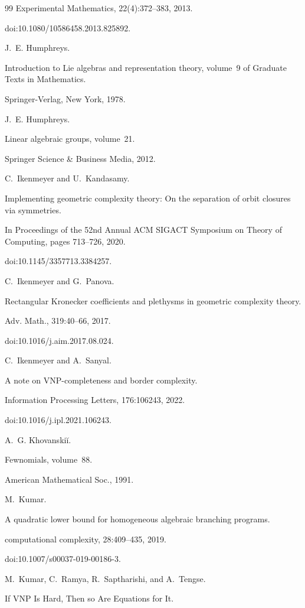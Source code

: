 \documentclass[10pt,a4paper]{article}
\begin{document}
\begin{thebibliography}{99}
Experimental Mathematics, 22(4):372–383, 2013.


doi:10.1080/10586458.2013.825892.

J. E. Humphreys.


Introduction to Lie algebras and representation theory,
volume 9 of Graduate Texts in Mathematics.


Springer-Verlag, New York, 1978.

J. E. Humphreys.


Linear algebraic groups, volume 21.


Springer Science \& Business Media, 2012.

C. Ikenmeyer and U. Kandasamy.


Implementing geometric complexity theory: On the separation of orbit
closures via symmetries.


In Proceedings of the 52nd Annual ACM SIGACT Symposium on
Theory of Computing, pages 713–726, 2020.


doi:10.1145/3357713.3384257.

C. Ikenmeyer and G. Panova.


Rectangular Kronecker coefficients and plethysms in geometric
complexity theory.


Adv. Math., 319:40–66, 2017.


doi:10.1016/j.aim.2017.08.024.

C. Ikenmeyer and A. Sanyal.


A note on VNP-completeness and border complexity.


Information Processing Letters, 176:106243, 2022.


doi:10.1016/j.ipl.2021.106243.

A. G. Khovanskiĭ.


Fewnomials, volume 88.


American Mathematical Soc., 1991.

M. Kumar.


A quadratic lower bound for homogeneous algebraic branching
programs.


computational complexity, 28:409–435, 2019.


doi:10.1007/s00037-019-00186-3.

M. Kumar, C. Ramya, R. Saptharishi, and A. Tengse.


If VNP Is Hard, Then so Are Equations for It.



\end{thebibliography}
\end{document}
